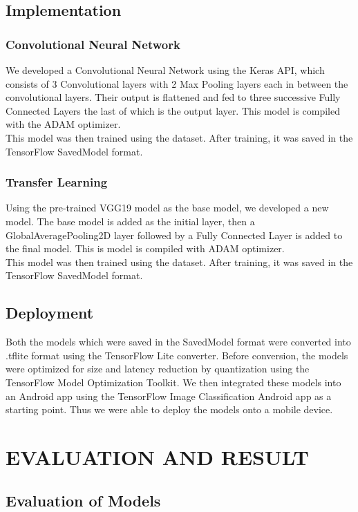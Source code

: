 \section{Implementation}
\subsection{Convolutional Neural Network}
We developed a Convolutional Neural Network using the Keras API, which consists of 3 Convolutional layers with 2 Max Pooling layers each in between the convolutional layers. Their output is flattened and fed to three successive Fully Connected Layers the last of which is the output layer. This model is compiled with the ADAM optimizer.\\

This model was then trained using the dataset. After training, it was saved in the TensorFlow SavedModel format.

\subsection{Transfer Learning}
Using the pre-trained VGG19 model as the base model, we developed a new model. The base model is added as the initial layer, then a GlobalAveragePooling2D layer followed by a Fully Connected Layer is added to the final model. This is model is compiled with ADAM optimizer.\\

This model was then trained using the dataset. After training, it was saved in the TensorFlow SavedModel format.

\section{Deployment}
Both the models which were saved in the SavedModel format were converted into .tflite format using the TensorFlow Lite converter. Before conversion, the models were optimized for size and latency reduction by quantization using the TensorFlow Model Optimization Toolkit. We then integrated these models into an Android app using the TensorFlow Image Classification Android app as a starting point. Thus we were able to deploy the models onto a mobile device.

\chapter{EVALUATION AND RESULT}
\section{Evaluation of Models}
